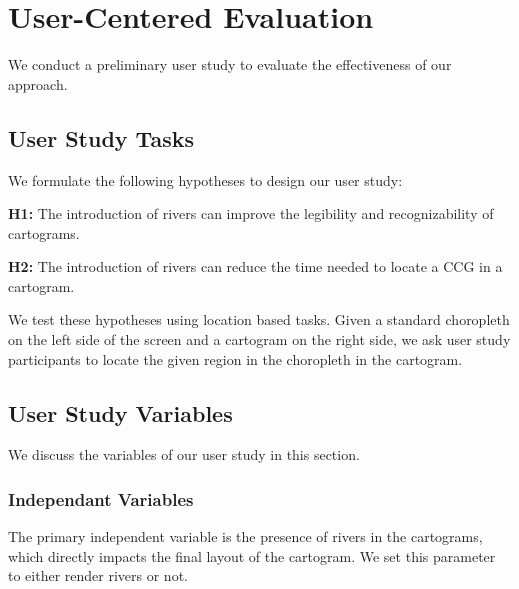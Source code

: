 \newcommand{\pCount}{15 }
\section{User-Centered Evaluation}

We conduct a preliminary user study to evaluate the effectiveness of our approach. 

\subsection{User Study Tasks}

We formulate the following hypotheses to design our user study:

\textbf{H1:} The introduction of rivers can improve the legibility and recognizability of cartograms.

\textbf{H2:} The introduction of rivers can reduce the time needed to locate a CCG in a cartogram.

We test these hypotheses using location based tasks. Given a standard choropleth on the left side of the screen and a cartogram on the right side, we ask user study participants to locate the given region in the choropleth in the cartogram.

\subsection{User Study Variables}

We discuss the variables of our user study in this section.

\subsubsection{Independant Variables}

The primary independent variable is the presence of rivers in the cartograms, which directly impacts the final layout of the cartogram. We set this parameter to either render rivers or not.



